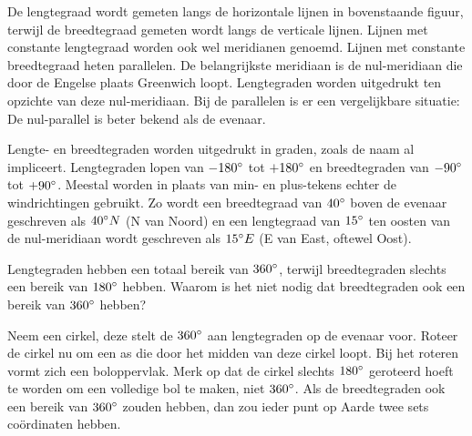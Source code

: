 De lengtegraad wordt gemeten langs de horizontale lijnen in bovenstaande figuur, terwijl de breedtegraad gemeten wordt langs de verticale lijnen. Lijnen met constante lengtegraad worden ook wel meridianen genoemd. Lijnen met constante breedtegraad heten parallelen. De belangrijkste meridiaan is de nul-meridiaan die door de Engelse plaats Greenwich loopt. Lengtegraden worden uitgedrukt ten opzichte van deze nul-meridiaan. Bij de parallelen is er een vergelijkbare situatie: De nul-parallel is beter bekend als de evenaar.

Lengte- en breedtegraden worden uitgedrukt in graden, zoals de naam al impliceert. Lengtegraden lopen van $-180\degree$ tot $+180\degree$ en breedtegraden van $-90\degree$ tot $+90\degree$. Meestal worden in plaats van min- en plus-tekens echter de windrichtingen gebruikt. Zo wordt een breedtegraad van $40\degree$ boven de evenaar geschreven als $40\degree N$ (N van Noord) en een lengtegraad van $15\degree$ ten oosten van de nul-meridiaan wordt geschreven als $15\degree E$ (E van East, oftewel Oost).

\begin{opgave}
	Lengtegraden hebben een totaal bereik van $360\degree$, terwijl breedtegraden slechts een bereik van $180\degree$ hebben. Waarom is het niet nodig dat breedtegraden ook een bereik van $360\degree$ hebben?
	\begin{antwoord}
		Neem een cirkel, deze stelt de $360\degree$ aan lengtegraden op de evenaar voor. Roteer de cirkel nu om een as die door het midden van deze cirkel loopt. Bij het roteren vormt zich een boloppervlak. Merk op dat de cirkel slechts $180\degree$ geroteerd hoeft te worden om een volledige bol te maken, niet $360\degree$. Als de breedtegraden ook een bereik van $360\degree$ zouden hebben, dan zou ieder punt op Aarde twee sets co\"ordinaten hebben.
	\end{antwoord}
\end{opgave}

